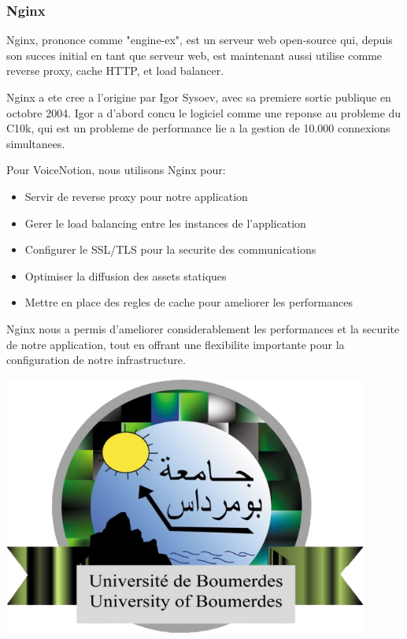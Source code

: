 \subsubsection{Nginx}
\begin{minipage}{0.7\textwidth}
Nginx, prononce comme "engine-ex", est un serveur web open-source qui, depuis son succes initial en tant que serveur web, est maintenant aussi utilise comme reverse proxy, cache HTTP, et load balancer.

Nginx a ete cree a l'origine par Igor Sysoev, avec sa premiere sortie publique en octobre 2004. Igor a d'abord concu le logiciel comme une reponse au probleme du C10k, qui est un probleme de performance lie a la gestion de 10.000 connexions simultanees.

Pour VoiceNotion, nous utilisons Nginx pour:
\begin{itemize}
    \item Servir de reverse proxy pour notre application
    \item Gerer le load balancing entre les instances de l'application
    \item Configurer le SSL/TLS pour la securite des communications
    \item Optimiser la diffusion des assets statiques
    \item Mettre en place des regles de cache pour ameliorer les performances
\end{itemize}

Nginx nous a permis d'ameliorer considerablement les performances et la securite de notre application, tout en offrant une flexibilite importante pour la configuration de notre infrastructure.
\end{minipage}%
\hfill
\begin{minipage}{0.25\textwidth}
\centering
\includegraphics[width=0.9\textwidth]{assets/docs/nginx.png}
\end{minipage}


